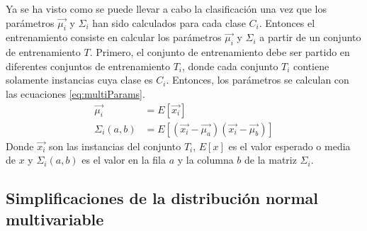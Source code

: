 \documentclass[a4paper, 11pt, oneside]{report}
\begin{document}
Ya se ha visto como se puede llevar a cabo la clasificación una vez que los parámetros $\vec{\mu_i}$ y $\Sigma_i$ han sido calculados para cada clase $C_i$. Entonces el entrenamiento consiste en calcular los parámetros $\vec{\mu_i}$ y $\Sigma_i$ a partir de un conjunto de entrenamiento $T$. Primero, el conjunto de entrenamiento debe ser partido en diferentes conjuntos de entrenamiento $T_i$, donde cada conjunto $T_i$ contiene solamente instancias cuya clase es $C_i$. Entonces, los parámetros se calculan con las ecuaciones \ref{eq:multiParams}.
\begin{equation}\label{eq:multiParams}
\begin{aligned}
	\vec{\mu_i} &= E[ \vec{x_i} ] \\
	\Sigma_i(a,b) &= E[ (\vec{x_i}-\vec{\mu_a})(\vec{x_i}-\vec{\mu_b}) ]
\end{aligned}
\end{equation}
Donde $\vec{x_i}$ son las instancias del conjunto $T_i$, $E[x]$ es el valor esperado o media de $x$ y $\Sigma_i(a,b)$ es el valor en la fila $a$ y la columna $b$ de la matriz $\Sigma_i$.

\subsection{Simplificaciones de la distribución normal multivariable}
\end{document}
